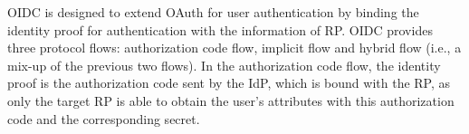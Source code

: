 

OIDC is designed to extend OAuth for user authentication by binding the identity proof for authentication with the information of RP. OIDC provides three protocol flows: authorization code flow, implicit flow and hybrid flow (i.e., a mix-up of the previous two flows). In the authorization code flow, the identity proof is the authorization code sent by the IdP, which is bound with the RP, as only the target RP is able to obtain the user's attributes with this authorization code and the corresponding secret.

